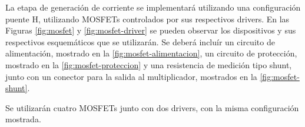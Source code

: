 \documentclass[../et.tex]{subfiles}
\begin{document}
La etapa de generación de corriente se implementará utilizando una configuración puente H, utilizando MOSFETs controlados por sus respectivos drivers. En las Figuras \ref{fig:mosfet} y \ref{fig:mosfet-driver} se pueden observar los dispositivos y sus respectivos esquemáticos que se utilizarán. Se deberá incluír un circuito de alimentación, mostrado en la \autoref{fig:mosfet-alimentacion}, un circuito de protección, mostrado en la \autoref{fig:mosfet-proteccion} y una resistencia de medición tipo shunt, junto con un conector para la salida al multiplicador, mostrados en la \autoref{fig:mosfet-shunt}.

Se utilizarán cuatro MOSFETs junto con dos drivers, con la misma configuración mostrada.
\end{document}
